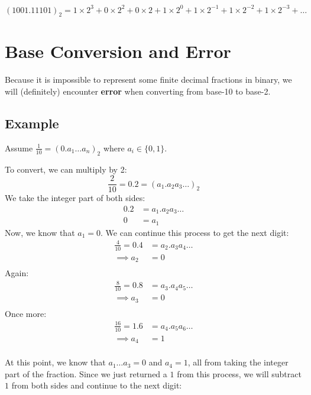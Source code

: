 \documentclass[12pt]{article}
\begin{document}
\begin{equation*}
  (1001.11101)_2 = 1\times 2^3 + 0\times 2^2 + 0\times 2 + 1\times 2^0 + 1\times 2^{-1} + 1\times 2^{-2} + 1\times 2^{-3} +\dots
\end{equation*}

\section{Base Conversion and Error}

Because it is impossible to represent some finite decimal fractions in binary,
we will (definitely) encounter \textbf{error} when converting from base-10 to base-2.


\subsection{Example}

Assume $\frac{1}{10} = (0.a_1 \dots a_n)_2$ where $a_i \in \{0, 1\}$.

To convert, we can multiply by 2:
\begin{equation*}
  \frac{2}{10} = 0.2 = (a_1 . a_2 a_3 \dots)_2
\end{equation*}
We take the integer part of both sides:
\begin{align*}
  0.2 &= a_1.a_2 a_3 \dots \\
  0 &= a_1
\end{align*}
Now, we know that $a_1 = 0$. We can continue this process to get the next
digit:
\begin{align*}
  \frac{4}{10} = 0.4 &= a_2.a_3 a_4 \dots \\
  \implies a_2 &= 0 \\
\end{align*}
Again:
\begin{align*}
  \frac{8}{10} = 0.8 &= a_3.a_4 a_5 \dots \\
  \implies a_3 &= 0 \\
\end{align*}
Once more:
\begin{align*}
  \frac{16}{10} = 1.6 &= a_4.a_5 a_6 \dots \\
  \implies a_4 &= 1 \\
\end{align*}

At this point, we know that $a_1 \dots a_3 = 0$ and $a_4 = 1$, all from taking
the integer part of the fraction. Since we just returned a $1$ from this process,
we will subtract $1$ from both sides and continue to the next digit:
\end{document}
